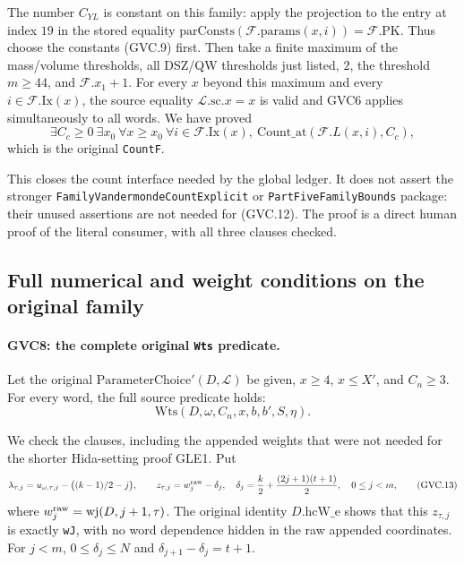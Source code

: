 The number $C_{YL}$ is constant on this family: apply the
projection to the entry at index $19$ in the stored equality
$\mathrm{parConsts}(\mathcal F.\mathrm{params}(x,i))
 =\mathcal F.\mathrm{PK}$.
Thus choose the constants (GVC.9) first.
Then take a finite maximum of the mass/volume thresholds, all
DSZ/QW thresholds just listed, $2$, the threshold $m\ge44$,
and $\mathcal F.x_1+1$. For every $x$ beyond this maximum and
every $i\in\mathcal F.\mathrm{Ix}(x)$, the source equality
$\mathcal L.\mathrm{sc}.x=x$ is valid and GVC6 applies
simultaneously to all words. We have proved
\[
 \exists C_c\ge0\ \exists x_0\
 \forall x\ge x_0\ \forall i\in\mathcal F.\mathrm{Ix}(x),\
               \mathrm{Count\_at}(\mathcal F.L(x,i),C_c),
                                                               \tag{GVC.12}
\]
which is the original \texttt{CountF}.

This closes the count interface needed by the global ledger.
It does not assert the stronger
\texttt{FamilyVandermondeCountExplicit} or
\texttt{PartFiveFamilyBounds} package: their unused assertions are
not needed for (GVC.12). The proof is a direct human proof of the
literal consumer, with all three clauses checked.

\subsection{Full numerical and weight conditions on the original family}

\paragraph{GVC8: the complete original \texttt{Wts} predicate.}
\label{claim:GVC8}
Let the original $\mathrm{ParameterChoice}'(D,\mathcal L)$ be
given, $x\ge4$, $x\le X'$, and $C_n\ge3$.
For every word, the full source predicate holds:
\[
              \mathrm{Wts}(D,\omega,C_n,x,b,b',S,\eta).
\]

We check the clauses, including the appended weights that were
not needed for the shorter Hida-setting proof GLE1.
Put
\[
 \lambda_{\tau,j}=u_{\omega,\tau,j}
                  -\bigl((k-1)/2-j\bigr),\qquad
 z_{\tau,j}=w_j^{\rm raw}
              -\delta_j,\quad
 \delta_j=\frac{k}{2}+\frac{(2j+1)(t+1)}2,\quad0\le j<m,
                                                               \tag{GVC.13}
\]
where $w_j^{\rm raw}=\mathrm{wj}(D,j+1,\tau)$.
The original identity $D.\mathrm{hcW\_e}$ shows that this
$z_{\tau,j}$ is exactly \texttt{wJ}, with no word dependence
hidden in the raw appended coordinates. For $j<m$,
$0\le\delta_j\le N$ and
$\delta_{j+1}-\delta_j=t+1$.


